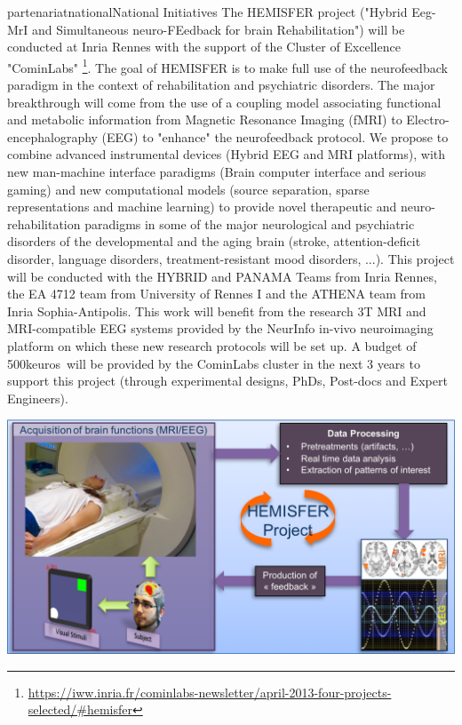 \documentclass{ra2018}
\begin{document}
\begin{module}{partenariat}{national}{National Initiatives}
        The HEMISFER project ("Hybrid Eeg-MrI and Simultaneous neuro-FEedback for brain
        Rehabilitation") will be conducted at Inria Rennes with the support of the
        Cluster of Excellence "CominLabs"
        \footnote{\url{https://iww.inria.fr/cominlabs-newsletter/april-2013-four-projects-selected/\#hemisfer}}.  
         The goal of HEMISFER is to make full use of the neurofeedback paradigm in
        the context of rehabilitation and psychiatric disorders. The major breakthrough
        will come from the use of a coupling model associating functional and metabolic
        information from Magnetic Resonance Imaging (fMRI) to Electro-encephalography
        (EEG) to "enhance" the neurofeedback protocol. We propose to combine advanced
        instrumental devices (Hybrid EEG and MRI platforms), with new man-machine
        interface paradigms (Brain computer interface and serious gaming) and new
        computational models (source separation, sparse representations and machine
        learning) to provide novel therapeutic and neuro-rehabilitation paradigms in
        some of the major neurological and psychiatric disorders of the developmental
        and the aging brain (stroke, attention-deficit disorder, language disorders,
        treatment-resistant mood disorders, ...). This project will be conducted with
        the HYBRID and PANAMA Teams from Inria Rennes, the EA 4712 team from University
        of Rennes I and the ATHENA team from Inria Sophia-Antipolis. This work will
        benefit from the research 3T MRI and MRI-compatible EEG systems provided by the
        NeurInfo in-vivo neuroimaging platform on which these new research protocols
        will be set up. A budget of 500keuros~will be provided by the CominLabs cluster
        in the next 3 years to support this project (through experimental designs,
        PhDs, Post-docs and Expert Engineers).

        \includegraphics{IMG/Hemisfer_Principle.png}
        

\end{module}
\end{document}
